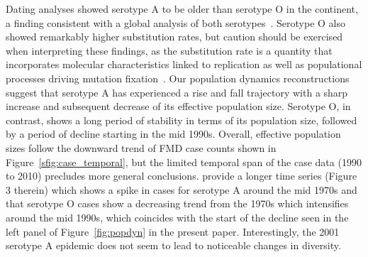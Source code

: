 \documentclass[10pt]{article}
\begin{document}
Dating analyses showed serotype A to be older than serotype O in the continent, a finding consistent with a global analysis of both serotypes~\citep{Tully2008}.
Serotype O also showed remarkably higher substitution rates, but caution should be exercised when interpreting these findings, as the substitution rate is a quantity that incorporates molecular characteristics linked to replication as well as populational processes driving mutation fixation~\citep{Holmes2016}.
Our population dynamics reconstructions suggest that serotype A has experienced a rise and fall trajectory with a sharp increase and subsequent decrease of its effective population size.
Serotype O, in contrast, shows a long period of stability in terms of its population size, followed by a period of decline starting in the mid 1990s. %
Overall, effective population sizes follow the downward trend of FMD case counts shown in Figure~\ref{sfig:case_temporal}, but the limited temporal span of the case data (1990 to 2010) precludes more general conclusions.
\citet{Naranjo2013} provide a longer time series (Figure 3 therein) which shows a spike in cases for serotype A around the mid 1970s and that serotype O cases show a decreasing trend from the 1970s which intensifies around the mid 1990s, which coincides with the start of the decline seen in the left panel of Figure~\ref{fig:popdyn} in the present paper.
Interestingly, the 2001 serotype A epidemic does not seem to lead to noticeable changes in diversity. %
\end{document}
